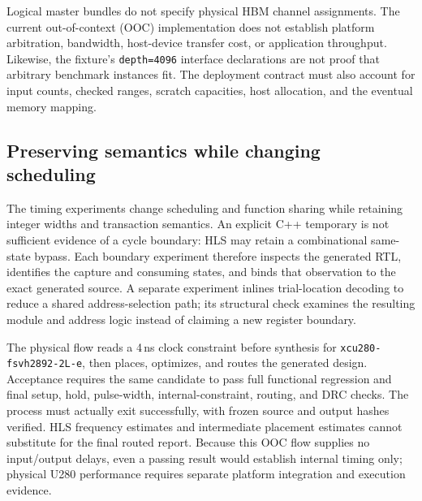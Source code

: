 Logical master bundles do not specify physical HBM channel assignments.
The current out-of-context (OOC) implementation does not establish platform
arbitration, bandwidth, host-device transfer cost, or application throughput.
Likewise, the fixture's \texttt{depth=4096} interface declarations are not proof
that arbitrary benchmark instances fit. The deployment contract must also
account for input counts, checked ranges, scratch capacities, host allocation,
and the eventual memory mapping.

\subsection{Preserving semantics while changing scheduling}

The timing experiments change scheduling and function sharing while retaining
integer widths and transaction semantics. An explicit C++ temporary is not
sufficient evidence of a cycle boundary: HLS may retain a combinational
same-state bypass. Each boundary experiment therefore inspects the generated
RTL, identifies the capture and consuming states, and binds that observation
to the exact generated source. A separate experiment inlines trial-location
decoding to reduce a shared address-selection path; its structural check
examines the resulting module and address logic instead of claiming a new
register boundary.

The physical flow reads a 4\,ns clock constraint before synthesis for
\texttt{xcu280-fsvh2892-2L-e}, then places, optimizes, and routes the generated
design. Acceptance requires the same candidate to pass full functional
regression and final setup, hold, pulse-width, internal-constraint, routing,
and DRC checks. The process must actually exit successfully, with frozen
source and output hashes verified. HLS frequency estimates and intermediate
placement estimates cannot substitute for the final routed report. Because
this OOC flow supplies no input/output delays, even a passing result would
establish internal timing only; physical U280 performance requires separate
platform integration and execution evidence.
